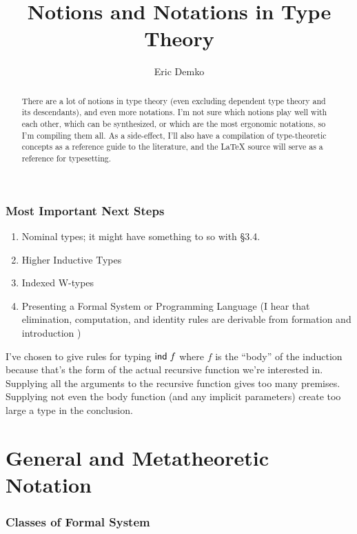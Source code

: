 \documentclass[11pt]{article} %
\title{Notions and Notations in Type Theory}
\author{Eric Demko}
\theoremstyle{definition}
\theoremstyle{remark}
\begin{document}
\maketitle
\begin{abstract}
There are a lot of notions in type theory (even excluding dependent type theory and its descendants), and even more notations.
I'm not sure which notions play well with each other, which can be synthesized, or which are the most ergonomic notations, so I'm compiling them all.
As a side-effect, I'll also have a compilation of type-theoretic concepts as a reference guide to the literature, and the \LaTeX{} source will serve as a reference for typesetting.
\end{abstract}

\section*{Most Important Next Steps}

\begin{enumerate}
  \item Nominal types; it might have something to so with \cite{diy_1989}\S3.4.
  \item Higher Inductive Types
  \item Indexed W-types
  \item Presenting a Formal System or Programming Language
    (I hear that elimination, computation, and identity rules are derivable from formation and introduction \cite{diy_1989})
\end{enumerate}

I've chosen to give rules for typing $\mathsf{ind}\;f$ where $f$ is the ``body'' of the induction because that's the form of the actual recursive function we're interested in.
Supplying all the arguments to the recursive function gives too many premises.
Supplying not even the body function (and any implicit parameters) create too large a type in the conclusion.

\tableofcontents
\pagebreak




\part{General and Metatheoretic Notation}

\section{Classes of Formal System}
\end{document}
